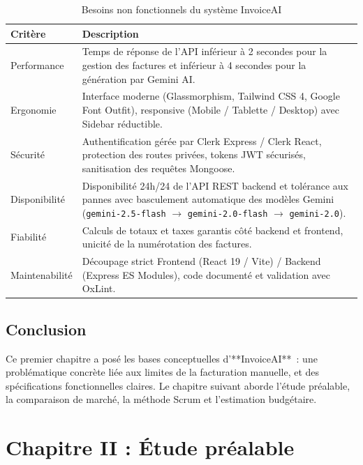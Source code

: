 \documentclass[a4paper,12pt]{extarticle}
\begin{document}
\begin{table}[H]
\centering
\caption{Besoins non fonctionnels du système InvoiceAI}
\begin{tabularx}{\textwidth}{|l|X|}
\hline
\rowcolor{igablue!15}
\textbf{Critère} & \textbf{Description} \\
\hline
Performance & Temps de réponse de l'API inférieur à 2 secondes pour la gestion des factures et inférieur à 4 secondes pour la génération par Gemini AI. \\
\hline
Ergonomie & Interface moderne (Glassmorphism, Tailwind CSS 4, Google Font Outfit), responsive (Mobile / Tablette / Desktop) avec Sidebar réductible. \\
\hline
Sécurité & Authentification gérée par Clerk Express / Clerk React, protection des routes privées, tokens JWT sécurisés, sanitisation des requêtes Mongoose. \\
\hline
Disponibilité & Disponibilité 24h/24 de l'API REST backend et tolérance aux pannes avec basculement automatique des modèles Gemini (\texttt{gemini-2.5-flash} $\rightarrow$ \texttt{gemini-2.0-flash} $\rightarrow$ \texttt{gemini-2.0}). \\
\hline
Fiabilité & Calculs de totaux et taxes garantis côté backend et frontend, unicité de la numérotation des factures. \\
\hline
Maintenabilité & Découpage strict Frontend (React 19 / Vite) / Backend (Express ES Modules), code documenté et validation avec OxLint. \\
\hline
\end{tabularx}
\end{table}

\subsection*{Conclusion}

Ce premier chapitre a posé les bases conceptuelles d'**InvoiceAI**~: une problématique concrète liée aux limites de la facturation manuelle, et des spécifications fonctionnelles claires. Le chapitre suivant aborde l'étude préalable, la comparaison de marché, la méthode Scrum et l'estimation budgétaire.

\newpage
\section{Chapitre II : Étude préalable}
\end{document}

